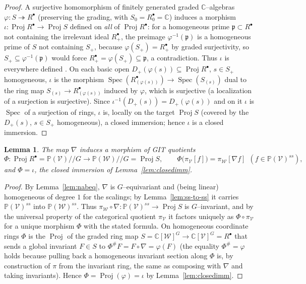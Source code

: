 \documentclass{amsart}
\newtheorem{lemma}{Lemma}
\theoremstyle{definition}
\DeclareMathOperator{\Spec}{Spec}
\DeclareMathOperator{\Proj}{Proj}
\newcommand{\PP}{\mathbb{P}}
\newcommand{\CC}{\mathbb{C}}
\newcommand{\nab}{\nabla}
\begin{document}
\begin{proof}
A surjective homomorphism of finitely generated graded $\CC$--algebras
$\varphi\colon S\twoheadrightarrow R^{\bullet}$ (preserving the grading, with
$S_0=R^{\bullet}_0=\CC$) induces a morphism $\iota\colon\Proj R^{\bullet}\to\Proj S$ defined
on \emph{all} of $\Proj R^{\bullet}$: for a homogeneous prime $\mathfrak p\subset R^{\bullet}$
not containing the irrelevant ideal $R^{\bullet}_{+}$, the preimage
$\varphi^{-1}(\mathfrak p)$ is a homogeneous prime of $S$ not containing $S_{+}$, because
$\varphi(S_{+})=R^{\bullet}_{+}$ by graded surjectivity, so $S_{+}\subseteq
\varphi^{-1}(\mathfrak p)$ would force $R^{\bullet}_{+}=\varphi(S_+)\subseteq\mathfrak p$, a
contradiction. Thus $\iota$ is everywhere defined \cite[Ch.~II, Ex.~2.14]{Hartshorne}. On each
basic open $D_{+}(\varphi(s))\subseteq\Proj R^{\bullet}$, $s\in S_{+}$ homogeneous, $\iota$ is
the morphism $\Spec(R^{\bullet}_{(\varphi(s))})\to\Spec(S_{(s)})$ dual to the ring map
$S_{(s)}\to R^{\bullet}_{(\varphi(s))}$ induced by $\varphi$, which is surjective (a
localization of a surjection is surjective). Since $\iota^{-1}(D_{+}(s))=D_{+}(\varphi(s))$ and
on it $\iota$ is $\Spec$ of a surjection of rings, $\iota$ is, locally on the target $\Proj S$
(covered by the $D_{+}(s)$, $s\in S_+$ homogeneous), a closed immersion; hence $\iota$ is a
closed immersion.
\end{proof}

\begin{lemma}\label{lem:Phi-is-iota}
The map $\nab$ induces a morphism of GIT quotients
\[
\Phi\colon \Proj R^{\bullet}=\PP(\mathcal V)/\!/G\longrightarrow \PP(\mathcal W)/\!/G=\Proj S,
\qquad \Phi\big(\pi_{\mathcal V}[f]\big)=\pi_{\mathcal W}[\nab f]\ \ (f\in\PP(\mathcal V)^{ss}),
\]
and $\Phi=\iota$, the closed immersion of Lemma~\ref{lem:closedimm}.
\end{lemma}

\begin{proof}
By Lemma~\ref{lem:nabeq}, $\nab$ is $G$--equivariant and (being linear) homogeneous of degree
$1$ for the scalings; by Lemma~\ref{lem:ss-to-ss} it carries $\PP(\mathcal V)^{ss}$ into
$\PP(\mathcal W)^{ss}$. Thus $\pi_{\mathcal W}\circ\nab\colon\PP(\mathcal V)^{ss}\to\Proj S$ is
$G$--invariant, and by the universal property of the categorical quotient $\pi_{\mathcal V}$
\cite[Ch.~1, \S 2, Thm.~1.10]{MFK} it factors uniquely as $\Phi\circ\pi_{\mathcal V}$ for a
unique morphism $\Phi$ with the stated formula. On homogeneous coordinate rings $\Phi$ is the
$\Proj$ of the graded ring map $S=\CC[\mathcal W]^{G}\to\CC[\mathcal V]^{G}=R^{\bullet}$ that
sends a global invariant $F\in S$ to $\Phi^{\#}F=F\circ\nab=\varphi(F)$ (the equality
$\Phi^{\#}=\varphi$ holds because pulling back a homogeneous invariant section along $\Phi$ is,
by construction of $\pi$ from the invariant ring, the same as composing with $\nab$ and taking
invariants). Hence $\Phi=\Proj(\varphi)=\iota$ by Lemma~\ref{lem:closedimm}.
\end{proof}
\end{document}
